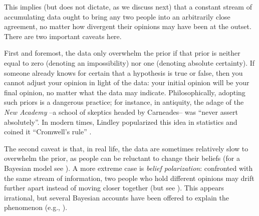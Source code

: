 \documentclass[man]{apa7}
\begin{document}
This implies (but does not dictate, as we discuss next) that a constant stream of accumulating data ought to bring any two people into an arbitrarily close agreement, no matter how divergent their opinions may have been at the outset. There are two important caveats here. 

First and foremost, the data only overwhelm the prior if that prior is neither equal to zero (denoting an impossibility) nor one (denoting absolute certainty). If someone already knows for certain that a hypothesis is true or false, then you cannot adjust your opinion in light of the data: your initial opinion will be your final opinion, no matter what the data may indicate. Philosophically, adopting such priors is a dangerous practice; for instance, in antiquity, the adage of the \emph{New Academy} --a school of skeptics headed by Carneades-- was ``never assert absolutely''. In modern times, Lindley popularized this idea in statistics and coined it ``Cromwell's rule'' \parencite[p. 104]{Lindley1985}.

The second caveat is that, in real life, the data are sometimes relatively slow to overwhelm the prior, as people can be reluctant to change their beliefs (for a Bayesian model see \cite{Gershman2019}). A more extreme case is \emph{belief polarization}: confronted with the same stream of information, two people who hold different opinions may drift further apart instead of moving closer together (but see \cite{Anglin2019}). This appears irrational, but several Bayesian accounts have been offered to explain the phenomenon (e.g., \cite{CookLewandowsky2016,JernEtAl2014}).
\end{document}
